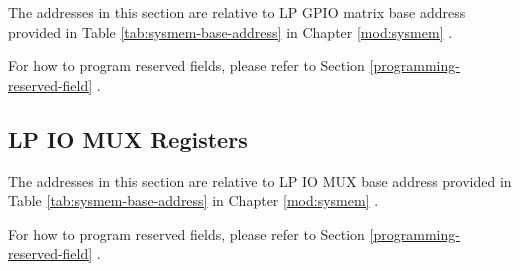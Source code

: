\documentclass[main\_\_EN.tex]{subfiles}
\begin{document}
The addresses in this section are relative to LP GPIO matrix base address provided in Table \ref{tab:sysmem-base-address} in Chapter \ref{mod:sysmem} \textit{}.

For how to program reserved fields, please refer to Section \ref{programming-reserved-field} \textit{}.



\subsection{LP IO MUX Registers}

The addresses in this section are relative to LP IO MUX base address provided in Table \ref{tab:sysmem-base-address} in Chapter \ref{mod:sysmem} \textit{}.

For how to program reserved fields, please refer to Section \ref{programming-reserved-field} \textit{}.


\end{document}
